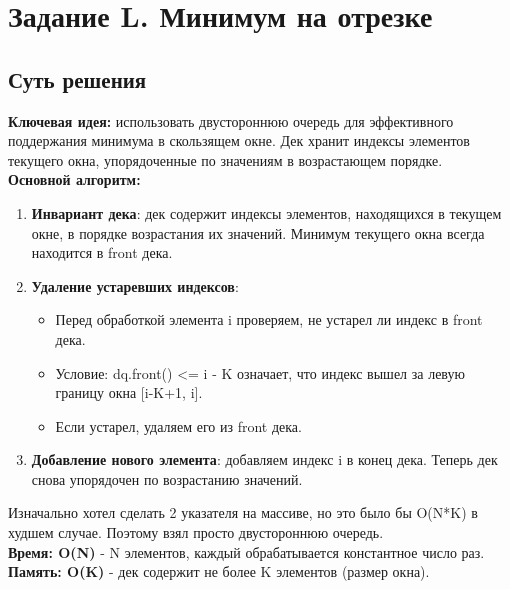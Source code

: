 \documentclass[a4paper,12pt]{article}
\begin{document}
    \newpage


    \section{Задание L. Минимум на отрезке}

    

    \subsection*{Суть решения}
    \textbf{Ключевая идея:} использовать двустороннюю очередь для эффективного поддержания минимума в скользящем окне. Дек хранит индексы элементов текущего окна, упорядоченные по значениям в возрастающем порядке.\\
    \textbf{Основной алгоритм:}
    \begin{enumerate}
        \item \textbf{Инвариант дека}: дек содержит индексы элементов, находящихся в текущем окне, в порядке возрастания их значений. Минимум текущего окна всегда находится в front дека.
        \item \textbf{Удаление устаревших индексов}:
        \begin{itemize}
            \item Перед обработкой элемента i проверяем, не устарел ли индекс в front дека.
            \item Условие: dq.front() <= i - K означает, что индекс вышел за левую границу окна [i-K+1, i].
            \item Если устарел, удаляем его из front дека.
        \end{itemize}
        \item \textbf{Добавление нового элемента}: добавляем индекс i в конец дека. Теперь дек снова упорядочен по возрастанию значений.
    \end{enumerate}
    Изначально хотел сделать 2 указателя на массиве, но это было бы O(N*K) в худшем случае. Поэтому взял просто двустороннюю очередь.\\
    \textbf{Время: O(N)} - N элементов, каждый обрабатывается константное число раз.\\
    \textbf{Память: O(K)} - дек содержит не более K элементов (размер окна).
\end{document}
